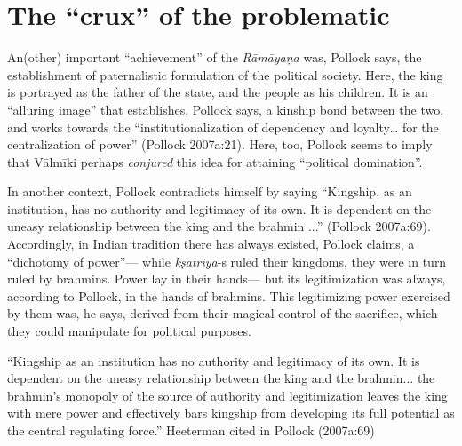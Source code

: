 \section{The “crux” of the problematic}\label{sec1.4}

An(other) important “achievement” of the {\sl Rāmāyaṇa} was, Pollock says, the establishment of paternalistic formulation of the political society. Here, the king is portrayed as the father of the state, and the people as his children. It is an “alluring image” that establishes, Pollock says, a kinship bond between the two, and works towards the “institutionalization of dependency and loyalty… for the centralization of power” (Pollock 2007a:21).  Here, too, Pollock seems to imply that Vālmīki perhaps {\sl conjured} this idea for attaining “political domination”. 

\newpage

In another context, Pollock contradicts himself by saying “Kingship, as an institution, has no authority and legitimacy of its own. It is dependent on the uneasy relationship between the king and the brahmin ...” (Pollock 2007a:69). Accordingly, in Indian tradition there has always existed, Pollock claims, a “dichotomy of power”--- while {\sl kṣatriya}-s ruled their kingdoms, they were in turn ruled by brahmins.  Power lay in their hands--- but its legitimization was always, according to Pollock, in the hands of brahmins. This legitimizing power exercised by them was, he says, derived from their magical control of the sacrifice, which they could manipulate for political purposes.

\begin{myquote}
“Kingship as an institution has no authority and legitimacy of its own. It is dependent on the uneasy relationship between the king and the brahmin... the brahmin’s monopoly of the source of authority and legitimization leaves the king with mere power and effectively bars kingship from developing its full potential as the central regulating force.” 	
\hfill Heeterman cited in Pollock (2007a:69)
\end{myquote}

